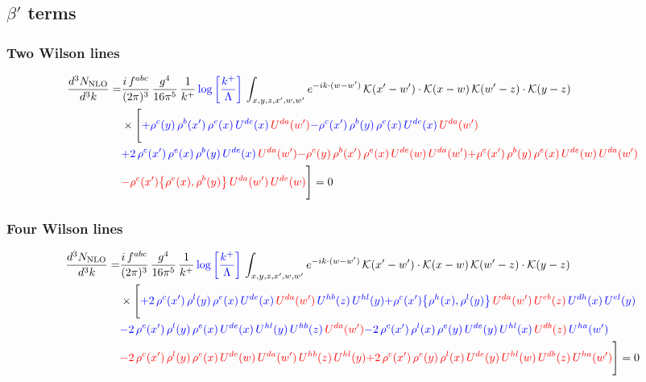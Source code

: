 \documentclass[9pt]{article}
\numberwithin{equation}{section}
\begin{document}
\subsection{$\beta'$ terms}
\subsubsection{Two Wilson lines}
\begin{align}
    \frac{d^{3}N_{\rm NLO}}{d^{3}k}= & \frac{i\,f^{abc}}{(2\pi)^{3}}\,\frac{g^{4}}{16\pi^{5}}\,\frac{1}{k^{+}}\,{\color{blue}\log{\left[\frac{k^{+}}{\Lambda}\right]}}\,\int_{x,y,z,x',w,w'}e^{-ik\cdot (w-w')}\,\mathcal{K}(x'-w')\cdot\mathcal{K}(x-w)\,\mathcal{K}(w'-z)\cdot\mathcal{K}(y-z)\notag \\ & \times\Bigg[{\color{blue}+\rho^{c}(y)\,\rho^{b}(x')\,\rho^{e}(x)\,U^{de}(x)\,{\color{red}U^{da}(w')}}{\color{blue}-\rho^{c}(x')\,\rho^{b}(y)\,\rho^{e}(x)\,U^{de}(x)\,{\color{red}U^{da}(w')}}\notag \\ & {\color{blue}+2\,\rho^{c}(x')\,\rho^{e}(x)\,\rho^{b}(y)\,U^{de}(x)\,{\color{red}U^{da}(w')}}{\color{red}-\rho^{c}(y)\,\rho^{b}(x')\,\rho^{e}(x)\,U^{de}(w)\,{\color{red}U^{da}(w')}}{\color{red}+\rho^{c}(x')\,\rho^{b}(y)\,\rho^{e}(x)\,U^{de}(w)\,{\color{red}U^{da}(w')}}\notag \\ & {\color{red} -\rho^{c}(x')\big\{\rho^{e}(x),\rho^{b}(y)\big\}\,{\color{red}U^{da}(w')}\,U^{de}(w)}\Bigg] = 0 
\end{align}    
\subsubsection{Four Wilson lines}
\begin{align}
    \frac{d^{3}N_{\rm NLO}}{d^{3}k}= & \frac{i\,f^{abc}}{(2\pi)^{3}}\,\frac{g^{4}}{16\pi^{5}}\,\frac{1}{k^{+}}\,{\color{blue}\log{\left[\frac{k^{+}}{\Lambda}\right]}}\,\int_{x,y,z,x',w,w'}e^{-ik\cdot (w-w')}\,\mathcal{K}(x'-w')\cdot\mathcal{K}(x-w)\,\mathcal{K}(w'-z)\cdot\mathcal{K}(y-z)\notag \\ & \times\Bigg[{\color{blue}+2\,\rho^{c}(x')\,\rho^{l}(y)\,\rho^{e}(x)\,U^{de}(x)\,{\color{red}U^{da}(w')}\,U^{hb}(z)\,U^{hl}(y)}{\color{blue}+\rho^{c}(x')\big\{\rho^{h}(x),\rho^{l}(y)\big\}\,{\color{red}U^{da}(w')}\,{\color{red}U^{eb}(z)}\,U^{dh}(x)\,U^{el}(y)}\notag \\ & {\color{blue}-2\,\rho^{c}(x')\,\rho^{l}(y)\,\rho^{e}(x)\,U^{de}(x)\,U^{hl}(y)\,U^{hb}(z)\,{\color{red}U^{da}(w')}}{\color{blue}-2\,\rho^{c}(x')\,\rho^{l}(x)\,\rho^{e}(y)\,U^{de}(y)\,U^{hl}(x)\,{\color{red}U^{db}(z)}\,U^{ha}(w')}\notag \\ & {\color{red}-2\,\rho^{c}(x')\,\rho^{l}(y)\,\rho^{e}(x)\,U^{de}(w)\,{\color{red}U^{da}(w')}\,U^{hb}(z)\,U^{hl}(y)}{\color{red}+2\,\rho^{c}(x')\,\rho^{e}(y)\,\rho^{l}(x)\,U^{de}(y)\,U^{hl}(w)\,U^{db}(z)\,U^{ha}(w')}\Bigg] = 0
\end{align}
\end{document}
